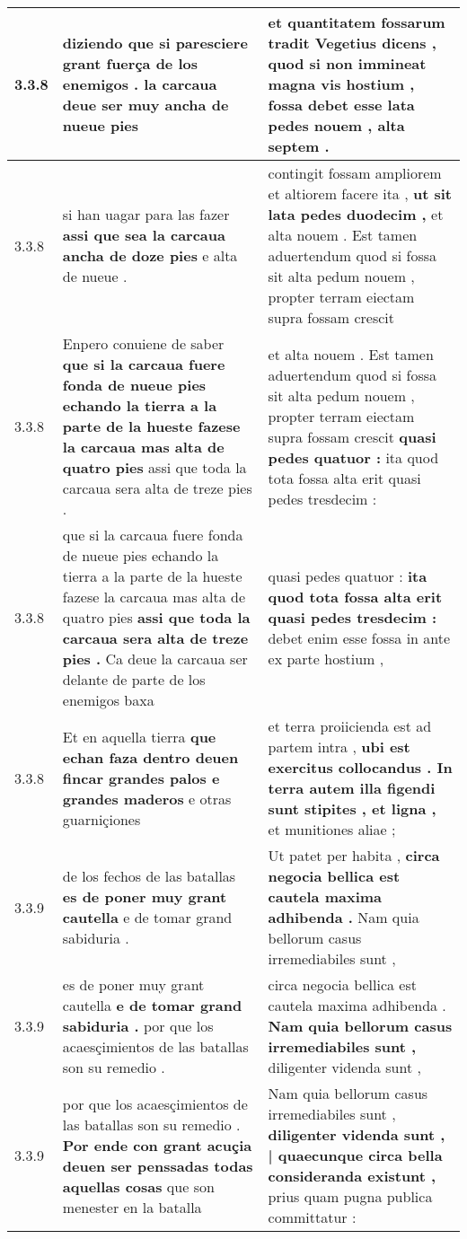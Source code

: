 \begin{tabular}{|p{1cm}|p{6.5cm}|p{6.5cm}|}
3.3.8 & diziendo \textbf{ que si paresciere grant fuerça de los enemigos . } la carcaua deue ser muy ancha de nueue pies & et quantitatem fossarum tradit Vegetius dicens , \textbf{ quod si non immineat magna vis hostium , } fossa debet esse lata pedes nouem , alta septem . \\\hline
3.3.8 & si han uagar para las fazer \textbf{ assi que sea la carcaua ancha de doze pies } e alta de nueue . & contingit fossam ampliorem et altiorem facere ita , \textbf{ ut sit lata pedes duodecim , } et alta nouem . Est tamen aduertendum quod si fossa sit alta pedum nouem , propter terram eiectam supra fossam crescit \\\hline
3.3.8 & Enpero conuiene de saber \textbf{ que si la carcaua fuere fonda de nueue pies echando la tierra a la parte de la hueste fazese la carcaua mas alta de quatro pies } assi que toda la carcaua sera alta de treze pies . & et alta nouem . Est tamen aduertendum quod si fossa sit alta pedum nouem , propter terram eiectam supra fossam crescit \textbf{ quasi pedes quatuor : } ita quod tota fossa alta erit quasi pedes tresdecim : \\\hline
3.3.8 & que si la carcaua fuere fonda de nueue pies echando la tierra a la parte de la hueste fazese la carcaua mas alta de quatro pies \textbf{ assi que toda la carcaua sera alta de treze pies . } Ca deue la carcaua ser delante de parte de los enemigos baxa & quasi pedes quatuor : \textbf{ ita quod tota fossa alta erit quasi pedes tresdecim : } debet enim esse fossa in ante ex parte hostium , \\\hline
3.3.8 & Et en aquella tierra \textbf{ que echan faza dentro deuen fincar grandes palos e grandes maderos } e otras guarniçiones & et terra proiicienda est ad partem intra , \textbf{ ubi est exercitus collocandus . In terra autem illa figendi sunt stipites , et ligna , } et munitiones aliae ; \\\hline
3.3.9 & de los fechos de las batallas \textbf{ es de poner muy grant cautella } e de tomar grand sabiduria . & Ut patet per habita , \textbf{ circa negocia bellica est cautela maxima adhibenda . } Nam quia bellorum casus irremediabiles sunt , \\\hline
3.3.9 & es de poner muy grant cautella \textbf{ e de tomar grand sabiduria . } por que los acaesçimientos de las batallas son su remedio . & circa negocia bellica est cautela maxima adhibenda . \textbf{ Nam quia bellorum casus irremediabiles sunt , } diligenter videnda sunt , \\\hline
3.3.9 & por que los acaesçimientos de las batallas son su remedio . \textbf{ Por ende con grant acuçia deuen ser penssadas todas aquellas cosas } que son menester en la batalla & Nam quia bellorum casus irremediabiles sunt , \textbf{ diligenter videnda sunt , | quaecunque circa bella consideranda existunt , } prius quam pugna publica committatur : \\\hline

\end{tabular}
